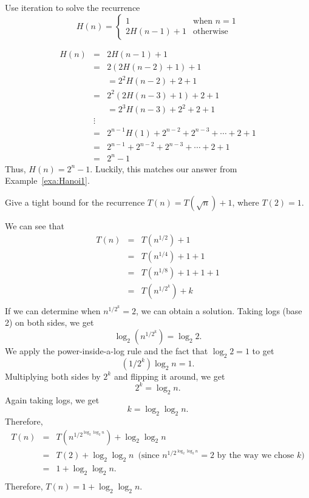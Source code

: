 \begin{exer}\label{exa:Hanoi2}
Use iteration to solve the recurrence
$$
H(n) = \left\{ 
\begin{array}{ll}
1&\mbox{when $n = 1$}\\
2 H(n-1) + 1 & \mbox{otherwise}
\end{array}
\right.
$$
\vspace*{7.5in}
\begin{answer} 
\begin{eqnarray*}
H(n)&=&2 H(n-1) + 1\\
&=&2(2 H(n-2) + 1) + 1\\
&&= 2^2 H(n-2) + 2 + 1\\
&=&2^2(2 H(n-3) + 1) + 2 + 1\\
&&= 2^3 H(n-3) + 2^2 + 2 + 1\\
&\vdots&\\
&=&2^{n-1}H(1) + 2^{n-2} + 2^{n-3}+\cdots + 2 + 1\\
&=&2^{n-1} + 2^{n-2} + 2^{n-3}+\cdots + 2 + 1\\
&=&2^n-1
\end{eqnarray*}
Thus, $H(n)=2^n-1$. Luckily, this matches our answer from Example~\ref{exa:Hanoi1}. 
\end{answer}
\end{exer}

\newpage

\begin{exa}
Give a tight bound for the recurrence $T(n)=T(\sqrt{n})+1$, where $T(2)=1$.
\begin{sol}
We can see that 
\begin{eqnarray*}
T(n)&=&T(n^{1/2})+1\\
&=&T(n^{1/4})+1+1\\
&=&T(n^{1/8})+1+1+1\\
&=&T(n^{1/2^k})+k\\
\end{eqnarray*}
If we can determine when $n^{1/2^k}=2$, we can obtain a solution.
Taking logs (base 2) on both sides, we get 
$$\log_2(n^{1/2^k})=\log_2 2.$$ 
We apply the power-inside-a-log rule
and the fact that $\log_2 2=1$ to get
$$(1/2^k)\log_2 n=1.$$
Multiplying both sides by $2^k$ and flipping it around, we get
$$2^k= \log_2 n.$$
Again taking logs, we get 
$$k=\log_2\log_2 n.$$
Therefore, 
\begin{eqnarray*}
T(n)&=&T(n^{1/2^{\log_2\log_2 n}})+\log_2\log_2 n\\
     &=&T(2)+\log_2\log_2 n\, \, \, \mbox{(since $n^{1/2^{\log_2\log_2 n}}=2$ by the way we chose $k$)}\\
     &=&1+\log_2\log_2 n.\\
\end{eqnarray*}
Therefore, $T(n)=1+\log_2\log_2 n$.
\end{sol}
\end{exa}

